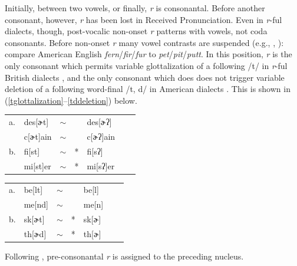 \documentclass[12pt]{article}
\newcommand{\alt}{\ensuremath{\sim}}
\begin{document}
Initially, between two vowels, or finally, \emph{r} is consonantal. Before another consonant, however, \emph{r} has been lost in Received Pronunciation. Even in \emph{r}-ful dialects, though, post-vocalic non-onset \emph{r} patterns with vowels, not coda consonants. Before non-onset \emph{r} many vowel contrasts are suspended (e.g., \citealp[269f.]{Fudge1969}, \citealp[][255]{Harris1994}): compare American English \emph{fern}/\emph{fir}/\emph{fur} to \emph{pet}/\emph{pit}/\emph{putt}. In this position, \emph{r} is the only consonant which permits variable glottalization of a following /t/ in \emph{r}-ful British dialects \citep[258]{Harris1994}, and the only consonant which does does not trigger variable deletion of a following word-final /t, d/ in American dialects \citep[8]{Guy1980}. This is shown in (\ref{tglottalization}--\ref{tddeletion}) below.

\begin{example}
\label{tglottalization}
\begin{tabular}{l l l l@{} l l l}
a. & {des}[ɚt]    & \alt{} &   & {des}[ɚʔ]    \\
   & {c}[ɚt]{ain} & \alt{} &   & {c}[ɚʔ]{ain} \\
b. & {fi}[st]     & \alt{} & * & {fi}[sʔ]     \\
   & {mi}[st]{er} & \alt{} & * & {mi}[sʔ]{er} \\
\end{tabular}
\end{example}

\begin{example}
\label{tddeletion}
\begin{tabular}{l l l l@{} l l l}
a. & {be}[lt] & \alt{} &   & {be}[l] \\
   & {me}[nd] & \alt{} &   & {me}[n] \\
b. & {sk}[ɚt] & \alt{} & * & {sk}[ɚ] \\
   & {th}[ɚd] & \alt{} & * & {th}[ɚ] \\
\end{tabular}
\end{example}

\noindent
Following \citet{Pierrehumbert1994}, pre-consonantal \emph{r} is assigned to the preceding nucleus.
\end{document}
